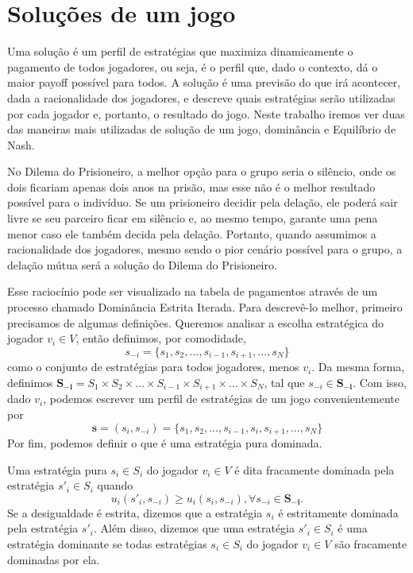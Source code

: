 
\section{Soluções de um jogo}

Uma solução é um perfil de estratégias que maximiza dinamicamente o pagamento de todos jogadores, ou seja, é o perfil que, dado o contexto, dá o maior payoff possível para todos. A solução é uma previsão do que irá acontecer, dada a racionalidade dos jogadores, e descreve quais estratégias serão utilizadas por cada jogador e, portanto, o resultado do jogo. Neste trabalho iremos ver duas das maneiras mais utilizadas de solução de um jogo, dominância e Equilíbrio de Nash.

No Dilema do Prisioneiro, a melhor opção para o grupo seria o silêncio, onde os dois ficariam apenas dois anos na prisão, mas esse não é o melhor resultado possível para o indivíduo. Se um prisioneiro decidir pela delação, ele poderá sair livre se seu parceiro ficar em silêncio e, ao mesmo tempo, garante uma pena menor caso ele também decida pela delação. Portanto, quando assumimos a racionalidade dos jogadores, mesmo sendo o pior cenário possível para o grupo, a delação mútua será a solução do Dilema do Prisioneiro.

Esse raciocínio pode ser visualizado na tabela de pagamentos através de um processo chamado Dominância Estrita Iterada. Para descrevê-lo melhor, primeiro precisamos de algumas definições. Queremos analisar a escolha estratégica do jogador $v_i\in V$, então definimos, por comodidade,
\begin{equation*}
    s_{-i}=\{s_{1},s_{2},\dots,s_{i-1},s_{i+1},\dots,s_{N}\}
\end{equation*}
como o conjunto de estratégias para todos jogadores, menos $v_i$. Da mesma forma, definimos $\boldsymbol{S_{-i}}=S_1\times S_2\times\dots\times S_{i-1}\times S_{i+1}\times\dots\times S_N$, tal que $s_{-i}\in \boldsymbol{S_{-i}}$. Com isso, dado $v_i$, podemos escrever um perfil de estratégias de um jogo convenientemente por
\begin{equation*}
    \boldsymbol{s}=(s_{i},s_{-i})=\{s_{1},s_{2},\dots,s_{i-1},s_{i},s_{i+1},\dots,s_{N}\}
\end{equation*}
Por fim, podemos definir o que é uma estratégia pura dominada.
\begin{definition}
    Uma estratégia pura $s_{i}\in S_i$ do jogador $v_i\in V$ é dita fracamente dominada pela estratégia $s'_{i}\in S_i$ quando
    \begin{equation}
        u_i(s'_{i},s_{-i})\geq u_i(s_{i},s_{-i}), \forall s_{-i}\in \boldsymbol{S_{-i}}.
        \label{fracaDominado}
    \end{equation}
    Se a desigualdade é estrita, dizemos que a estratégia $s_{i}$ é estritamente dominada pela estratégia $s'_{i}$. Além disso, dizemos que uma estratégia $s'_i\in S_i$ é uma estratégia dominante se todas estratégias $s_{i}\in S_i$ do jogador $v_i\in V$ são fracamente dominadas por ela.
\end{definition}

